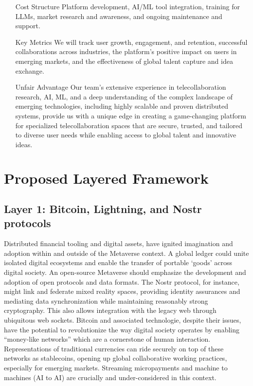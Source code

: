 \begin{itemize}
\item [Cost Structure] Platform development, AI/ML tool integration, training for LLMs, market research and awareness, and ongoing maintenance and support.
\item [Key Metrics] We will track user growth, engagement, and retention, successful collaborations across industries, the platform's positive impact on users in emerging markets, and the effectiveness of global talent capture and idea exchange.
\item [Unfair Advantage] Our team's extensive experience in telecollaboration research, AI, ML, and a deep understanding of the complex landscape of emerging technologies, including highly scalable and proven distributed systems, provide us with a unique edge in creating a game-changing platform for specialized telecollaboration spaces that are secure, trusted, and tailored to diverse user needs while enabling access to global talent and innovative ideas.
\end{itemize}
\section{Proposed Layered Framework}
\subsection{Layer 1: Bitcoin, Lightning, and Nostr protocols}
Distributed financial tooling and digital assets, have ignited imagination and adoption within and outside of the Metaverse context. A global ledger could unite isolated digital ecosystems and enable the transfer of portable `goods' across digital society. An open-source Metaverse should emphasize the development and adoption of open protocols and data formats. The Nostr protocol, for instance, might link and federate mixed reality spaces, providing identity assurances and mediating data synchronization while maintaining reasonably strong cryptography. This also allows integration with the legacy web through ubiquitous web sockets. Bitcoin and associated technologie, despite their issues, have the potential to revolutionize the way digital society operates by enabling ``money-like networks'' which are a cornerstone of human interaction. Representations of traditional currencies can ride securely on top of these networks as stablecoins, opening up global collaborative working practices, especially for emerging markets. Streaming micropayments and machine to machines (AI to AI) are crucially and under-considered in this context.


